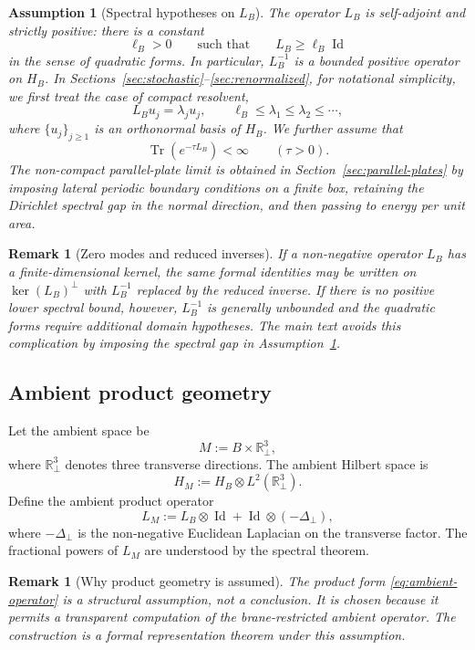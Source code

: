 \documentclass[11pt]{article}
\newtheorem{assumption}[theorem]{Assumption}
\newtheorem{remark}[theorem]{Remark}
\newcommand{\R}{\mathbb{R}}
\newcommand{\Tr}{\operatorname{Tr}}
\newcommand{\Id}{\operatorname{Id}}
\begin{document}
\begin{assumption}[Spectral hypotheses on $L_B$]
\label{ass:L_B}
The operator $L_B$ is self-adjoint and strictly positive: there is a constant
\[
    \ell_B>0
    \qquad\text{such that}\qquad
    L_B\geq \ell_B\Id
\]
in the sense of quadratic forms.  In particular, $L_B^{-1}$ is a bounded positive operator on $H_B$.  In Sections~\ref{sec:stochastic}--\ref{sec:renormalized}, for notational simplicity, we first treat the case of compact resolvent,
\[
    L_B u_j=\lambda_j u_j, \qquad
    \ell_B\leq\lambda_1\leq \lambda_2\leq\cdots,
\]
where $\{u_j\}_{j\geq1}$ is an orthonormal basis of $H_B$.  We further assume that
\[
    \Tr(e^{-\tau L_B})<\infty \qquad (\tau>0).
\]
The non-compact parallel-plate limit is obtained in Section~\ref{sec:parallel-plates} by imposing lateral periodic boundary conditions on a finite box, retaining the Dirichlet spectral gap in the normal direction, and then passing to energy per unit area.
\end{assumption}

\begin{remark}[Zero modes and reduced inverses]
If a non-negative operator $L_B$ has a finite-dimensional kernel, the same formal identities may be written on $\ker(L_B)^{\perp}$ with $L_B^{-1}$ replaced by the reduced inverse.  If there is no positive lower spectral bound, however, $L_B^{-1}$ is generally unbounded and the quadratic forms require additional domain hypotheses.  The main text avoids this complication by imposing the spectral gap in Assumption~\ref{ass:L_B}.
\end{remark}

\subsection{Ambient product geometry}

Let the ambient space be
\[
    M := B\times \R^3_{\perp},
\]
where $\R^3_\perp$ denotes three transverse directions.  The ambient Hilbert space is
\[
    H_M := H_B\otimes L^2(\R^3_\perp).
\]
Define the ambient product operator
\begin{equation}
    L_M := L_B\otimes \Id + \Id\otimes (-\Delta_\perp),
    \label{eq:ambient-operator}
\end{equation}
where $-\Delta_\perp$ is the non-negative Euclidean Laplacian on the transverse factor.  The fractional powers of $L_M$ are understood by the spectral theorem.

\begin{remark}[Why product geometry is assumed]
The product form \eqref{eq:ambient-operator} is a structural assumption, not a conclusion.  It is chosen because it permits a transparent computation of the brane-restricted ambient operator.  The construction is a formal representation theorem under this assumption.
\end{remark}
\end{document}
